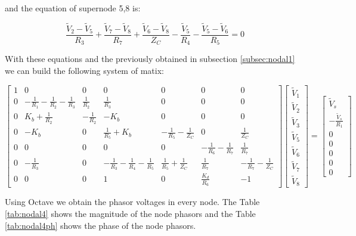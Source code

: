 and the equation of supernode 5,8 is:

\begin{equation}
   \frac{\tilde{V}_2 - \tilde{V}_5}{R_3} + \frac{\tilde{V}_7 - \tilde{V}_8}{R_7} + \frac{\tilde{V}_6 - \tilde{V}_8}{Z_C} - \frac{\tilde{V}_5}{R_4} - \frac{\tilde{V}_5 - \tilde{V}_6}{R_5} = 0
\end{equation}

With these equations and the previously obtained in subsection \ref{subsec:nodal1} we can build the following system of matix:


\begin{equation}
\begin{bmatrix}
1 & 0& 0& 0& 0& 0& 0 \\ 
0 & -\frac{1}{R_{1}}-\frac{1}{R_{2}}-\frac{1}{R_{3}} & \frac{1}{R_{2}} & \frac{1}{R_{3}} & 0&  0& 0\\ 
0 & K_{b}+\frac{1}{R_{2}} & -\frac{1}{R_{2}} & -K_{b} & 0 &  0& 0\\ 
0 & -K_{b} & 0 & \frac{1}{R_{5}}+K_{b} & -\frac{1}{R_{5}}-\frac{1}{Z_{C}} & 0 &\frac{1}{Z_{C}} \\ 
0 & 0 &0  & 0 &0  & -\frac{1}{R_{6}}-\frac{1}{R_{7}} & \frac{1}{R_{7}} \\
0 & -\frac{1}{R_{3}} &0  & -\frac{1}{R_{3}}-\frac{1}{R_{4}}-\frac{1}{R_{5}} & \frac{1}{R_{5}}+\frac{1}{Z_{C}} & \frac{1}{R_{7}} & -\frac{1}{R_{7}}-\frac{1}{Z_{C}}\\ 
0 & 0 & 0 & 1 & 0 & \frac{K_{d}}{R_{6}} & -1
\end{bmatrix}
\begin{bmatrix}
\tilde{V}_{1}\\ 
\tilde{V}_{2}\\ 
\tilde{V}_{3}\\ 
\tilde{V}_{5}\\ 
\tilde{V}_{6}\\ 
\tilde{V}_{7}\\ 
\tilde{V}_{8}
\end{bmatrix}
=
\begin{bmatrix}
\tilde{V}_{s}\\ 
-\frac{\tilde{V}_{s}}{R_{1}}\\ 
0\\ 
0\\ 
0\\ 
0\\ 
0
\end{bmatrix}
\end{equation}
 
Using Octave we obtain the phasor voltages in every node. The Table \ref{tab:nodal4} shows the magnitude of the node phasors and the Table \ref{tab:nodal4ph} shows the phase of the node phasors. 

